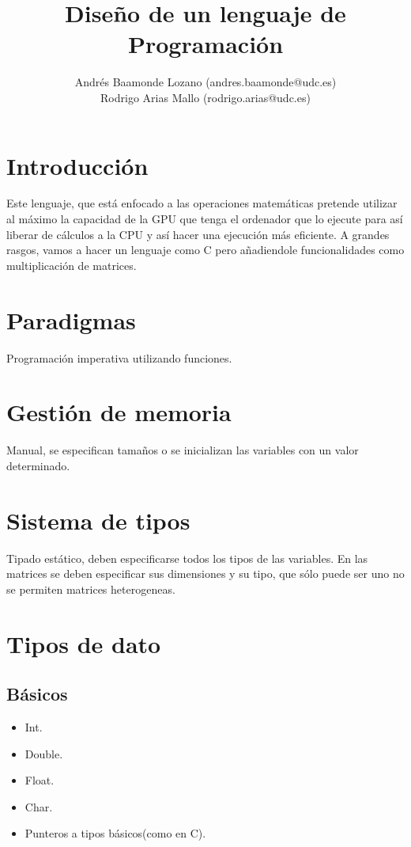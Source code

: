 \documentclass[12pt,a4paper]{article}
\title{Diseño de un lenguaje de Programación}
\author{Andrés Baamonde Lozano (andres.baamonde@udc.es)\\
	Rodrigo Arias Mallo (rodrigo.arias@udc.es)}
\begin{document}
\maketitle

\clearpage 

\tableofcontents

\clearpage 

\section{Introducción}
Este lenguaje, que está enfocado a las operaciones matemáticas pretende utilizar al máximo la capacidad de la GPU que tenga el ordenador que lo ejecute para así liberar de cálculos a la CPU y así hacer  una ejecución más eficiente. A grandes rasgos, vamos a hacer un lenguaje como C pero añadiendole funcionalidades como multiplicación de matrices.
\section{Paradigmas}
Programación imperativa utilizando funciones.
\section{Gestión de memoria}
Manual, se especifican tamaños o se inicializan las variables con un valor determinado.
\section{Sistema de tipos}
Tipado estático, deben especificarse todos los tipos de las variables. En las matrices se deben especificar sus dimensiones y su tipo, que sólo puede ser uno no se permiten matrices heterogeneas. 
\section{Tipos de dato}
\subsection{Básicos}
\begin{itemize}
\item Int.
\item Double.
\item Float.
\item Char.
\item Punteros a tipos básicos(como en C).
\end{itemize}
\end{document}
